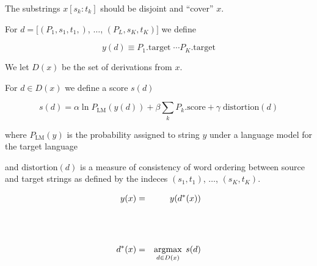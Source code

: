 {\vfill
The substrings $x[s_k:t_k]$ should be disjoint and ``cover'' $x$.

\vfill
For $d = [(P_1,s_1,t_1,)$, $\ldots$, $(P_L,s_K,t_K)]$ we define

$$ y(d) \equiv P_1.\mathrm{target}\;\cdots P_K.\mathrm{target}$$

\vfill
We let $D(x)$ be the set of derivations from $x$.


For $d \in D(x)$ we define a score $s(d)$

\vfill
$$s(d) = \alpha \ln P_\mathrm{LM}(y(d)) + \beta \sum_k P_k.\mathrm{score} + \gamma \;\mathrm{distortion}(d)$$

\vfill
where $P_{\mathrm{LM}}(y)$ is the probability assigned to string $y$ under a language model for the target language

\vfill
and $\mathrm{distortion}(d)$ is a measure of consistency of word ordering between source and target strings as defined by
the indeces $(s_1,t_1)$, $\ldots$, $(s_K,t_K)$.


\begin{eqnarray*}
  y(x) & = & y(d^*(x)) \\
  \\
  \\
  \\
  d^*(x) & = & \operatorname*{argmax}_{d \in D(x)} \;s(d)
\end{eqnarray*}

}

